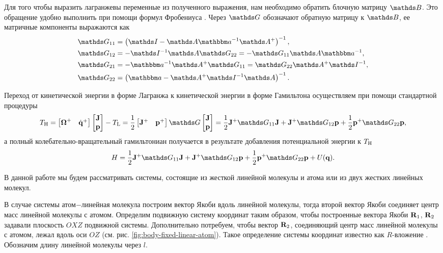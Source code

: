 Для того чтобы выразить лагранжевы переменные из полученного выражения, нам необходимо обратить блочную матрицу $\bbB$. Это обращение удобно выполнить при помощи формул Фробениуса \cite{gantmaher}. Через $\bbG$ обозначают обратную матрицу к $\bbB$, ее матричные компоненты выражаются как \cite{petrov2015}
\begin{gather}
    \begin{aligned}
        \bbG_{11} &= \lb \bbI - \bbA \bba^{-1} \bbA^+ \rb^{-1}, \\
        \bbG_{12} &= -\bbI^{-1} \bbA \bbG_{22} = -\bbG_{11} \bbA \bba^{-1}, \\
        \bbG_{21} &= -\bba^{-1} \bbA^+ \bbG_{11} = \bbG_{22} \bbA^+ \bbI^{-1}, \\
        \bbG_{22} &= \lb \bba - \bbA^+ \bbI^{-1} \bbA \rb^{-1}.
    \end{aligned} \label{polyatom-frobenius}
\end{gather}

Переход от кинетической энергии в форме Лагранжа к кинетической энергии в форме Гамильтона осуществляем при помощи стандартной процедуры \cite{goldstein}
\begin{gather}
    \Th = \begin{bmatrix} \bOmega^+ & \dot{\mf{q}}^+ \end{bmatrix} \begin{bmatrix} \mf{J} \\ \mf{p} \end{bmatrix} - \Tl = \frac{1}{2} \begin{bmatrix} \mf{J}^+ & \mf{p}^+ \end{bmatrix} \bbG \begin{bmatrix} \mf{J} \\ \mf{p} \end{bmatrix} = \frac{1}{2} \mf{J}^+ \bbG_{11} \mf{J} + \mf{J}^+ \bbG_{12} \mf{p} + \frac{1}{2} \mf{p}^+ \bbG_{22} \mf{p}, \label{general-rovibrational-kin-energy} 
\end{gather}
а полный колебательно-вращательный гамильтониан получается в результате добавления потенциальной энергии к $T_\text{H}$
\begin{gather}
    H = \frac{1}{2} \mf{J}^+ \bbG_{11} \mf{J} + \mf{J}^+ \bbG_{12} \mf{p} + \frac{1}{2} \mf{p}^+ \bbG_{22} \mf{p} + U(\mf{q}). \label{general-rovibrational-hamiltonian} 
\end{gather}

В данной работе мы будем рассматривать системы, состоящие из жесткой линейной молекулы и атома или из двух жестких линейных молекул. \par
В случае системы атом$-$линейная молекула построим вектор Якоби вдоль линейной молекулы, тогда второй вектор Якоби соединяет центр масс линейной молекулы с атомом. Определим подвижную систему координат таким образом, чтобы построенные вектора Якоби $\mathbf{R}_1$, $\mathbf{R}_2$ задавали плоскость $OXZ$ подвижной системы. Дополнительно потребуем, чтобы вектор $\mathbf{R}_2$, соединяющий центр масс линейной молекулы с атомом, лежал вдоль оси $OZ$ (см. рис. \ref{fig:body-fixed-linear-atom}). Такое определение системы координат известно как $R$-вложение \cite{tennyson1986}. Обозначим длину линейной молекулы через $l$.
    
